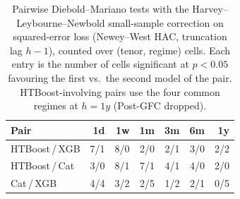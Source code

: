 \begin{table}[htbp]
\centering
\caption{Pairwise Diebold--Mariano tests with the Harvey--Leybourne--Newbold small-sample correction on squared-error loss (Newey--West HAC, truncation lag $h-1$), counted over (tenor, regime) cells. Each entry is the number of cells significant at $p<0.05$ favouring the first vs.\ the second model of the pair. HTBoost-involving pairs use the four common regimes at $h=1y$ (Post-GFC dropped).}
\label{tab:oos_dmh}
\footnotesize
\begin{tabular}{lrrrrrr}
\toprule
Pair & 1d & 1w & 1m & 3m & 6m & 1y \\
\midrule
HTBoost\,/\,XGB & 7/1 & 8/0 & 2/0 & 2/1 & 3/0 & 2/2 \\
HTBoost\,/\,Cat & 3/0 & 8/1 & 7/1 & 4/1 & 4/0 & 2/0 \\
Cat\,/\,XGB & 4/4 & 3/2 & 2/5 & 1/2 & 2/1 & 0/5 \\
\bottomrule
\end{tabular}
\end{table}
